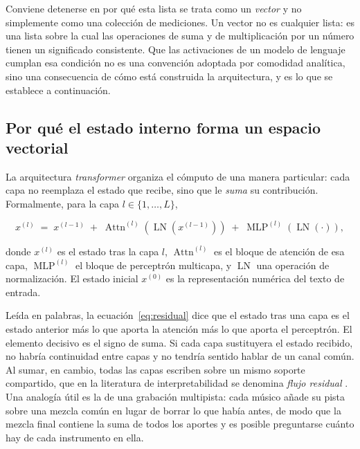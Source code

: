 Conviene detenerse en por qué esta lista se trata como un \textit{vector} y no
simplemente como una colección de mediciones. Un vector no es cualquier lista:
es una lista sobre la cual las operaciones de suma y de multiplicación por un
número tienen un significado consistente. Que las activaciones de un modelo de
lenguaje cumplan esa condición no es una convención adoptada por comodidad
analítica, sino una consecuencia de cómo está construida la arquitectura, y es
lo que se establece a continuación.

\subsection{Por qué el estado interno forma un espacio vectorial}

La arquitectura \textit{transformer} \parencite{vaswani2017} organiza el
cómputo de una manera particular: cada capa no reemplaza el estado que recibe,
sino que le \textit{suma} su contribución. Formalmente, para la capa
$l \in \{1,\dots,L\}$,

\begin{equation}
  x^{(l)} \;=\; x^{(l-1)}
  \;+\; \operatorname{Attn}^{(l)}\!\left(\operatorname{LN}\!\left(x^{(l-1)}\right)\right)
  \;+\; \operatorname{MLP}^{(l)}\!\left(\operatorname{LN}(\cdot)\right),
  \label{eq:residual}
\end{equation}

\noindent
donde $x^{(l)}$ es el estado tras la capa $l$, $\operatorname{Attn}^{(l)}$ es el
bloque de atención de esa capa, $\operatorname{MLP}^{(l)}$ el bloque de
perceptrón multicapa, y $\operatorname{LN}$ una operación de normalización. El
estado inicial $x^{(0)}$ es la representación numérica del texto de entrada.

Leída en palabras, la ecuación~\eqref{eq:residual} dice que el estado tras una
capa es el estado anterior más lo que aporta la atención más lo que aporta el
perceptrón. El elemento decisivo es el signo de suma. Si cada capa sustituyera
el estado recibido, no habría continuidad entre capas y no tendría sentido
hablar de un canal común. Al sumar, en cambio, todas las capas escriben sobre
un mismo soporte compartido, que en la literatura de interpretabilidad se
denomina \textit{flujo residual} \parencite{elhage2021}. Una analogía útil es
la de una grabación multipista: cada músico añade su pista sobre una mezcla
común en lugar de borrar lo que había antes, de modo que la mezcla final
contiene la suma de todos los aportes y es posible preguntarse cuánto hay de
cada instrumento en ella.

